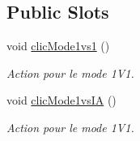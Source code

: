 \subsection*{Public Slots}
\begin{DoxyCompactItemize}
\item 
void \hyperlink{classAffichageMenu_ae62a39124cc5bb46805c464f23cd0ea0}{clic\+Mode1vs1} ()
\begin{DoxyCompactList}\small\item\em Action pour le mode 1\+V1. \end{DoxyCompactList}\item 
void \hyperlink{classAffichageMenu_a737cc4c685ddd031cad5286d513e9002}{clic\+Mode1vs\+I\+A} ()
\begin{DoxyCompactList}\small\item\em Action pour le mode 1\+V1. \end{DoxyCompactList}\end{DoxyCompactItemize}
